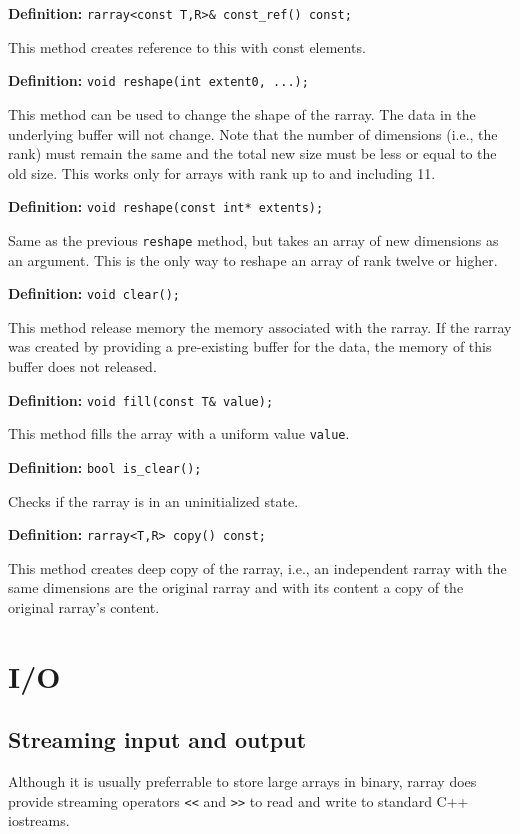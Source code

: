 \documentclass[11pt,twoside]{article}
\begin{document}
\noindent\textbf{Definition:} \texttt{rarray{\tt<}const T,R{\tt>}\& const\_ref() const;}

This method creates reference to this with const elements.

\noindent\textbf{Definition:} \texttt{void reshape(int extent0, ...);}

This method can be used to change the shape of the rarray. The data in
the underlying buffer will not change. Note that the number of
dimensions (i.e., the rank) must remain the same and the total new size must be less or equal to the old size.  This works only for arrays with rank up to and including 11. 

\noindent\textbf{Definition:} \texttt{void reshape(const int* extents);}

Same as the previous \texttt{reshape} method, but takes an array of new dimensions as an argument.  This is the only way to reshape an array of rank twelve or higher.

\noindent\textbf{Definition:} \texttt{void clear();}

This method release memory the memory associated with the rarray. If the rarray was created by providing a pre-existing buffer for the data, the memory of this buffer does not released.

\noindent\textbf{Definition:} \texttt{void fill(const T\& value);}

This method fills the array with a uniform value \texttt{value}.

\noindent\textbf{Definition:} \texttt{bool is\_clear();}

Checks if the rarray is in an uninitialized state.

\noindent\textbf{Definition:} \texttt{rarray{\tt<}T,R{\tt>} copy() const;}

This method creates deep copy of the rarray, i.e., an independent rarray with the same dimensions are the original rarray and with its content a copy of the original rarray's content.

\section{I/O}

\subsection{Streaming input and output}

Although it is usually preferrable to store large arrays in binary, rarray does provide streaming operators \texttt{<<} and \texttt{>>} to read and write to standard C++ iostreams.  
\end{document}

